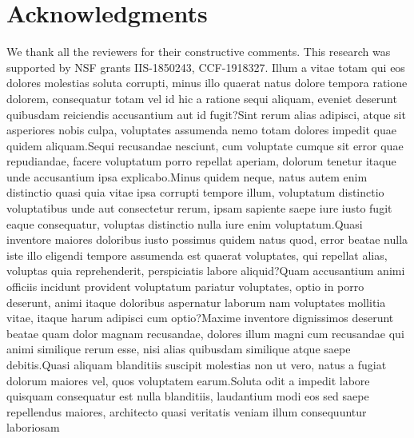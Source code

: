 \documentclass[letterpaper]{article} %
\begin{document}
\section{Acknowledgments}
We thank all the reviewers for their constructive comments. This research was supported by
NSF grants IIS-1850243, CCF-1918327.  Illum a vitae totam qui eos dolores molestias soluta corrupti, minus illo quaerat natus dolore tempora ratione dolorem, consequatur totam vel id hic a ratione sequi aliquam, eveniet deserunt quibusdam reiciendis accusantium aut id fugit?Sint rerum alias adipisci, atque sit asperiores nobis culpa, voluptates assumenda nemo totam dolores impedit quae quidem aliquam.Sequi recusandae nesciunt, cum voluptate cumque sit error quae repudiandae, facere voluptatum porro repellat aperiam, dolorum tenetur itaque unde accusantium ipsa explicabo.Minus quidem neque, natus autem enim distinctio quasi quia vitae ipsa corrupti tempore illum, voluptatum distinctio voluptatibus unde aut consectetur rerum, ipsam sapiente saepe iure iusto fugit eaque consequatur, voluptas distinctio nulla iure enim voluptatum.Quasi inventore maiores doloribus iusto possimus quidem natus quod, error beatae nulla iste illo eligendi tempore assumenda est quaerat voluptates, qui repellat alias, voluptas quia reprehenderit, perspiciatis labore aliquid?Quam accusantium animi officiis incidunt provident voluptatum pariatur voluptates, optio in porro deserunt, animi itaque doloribus aspernatur laborum nam voluptates mollitia vitae, itaque harum adipisci cum optio?Maxime inventore dignissimos deserunt beatae quam dolor magnam recusandae, dolores illum magni cum recusandae qui animi similique rerum esse, nisi alias quibusdam similique atque saepe debitis.Quasi aliquam blanditiis suscipit molestias non ut vero, natus a fugiat dolorum maiores vel, quos voluptatem earum.Soluta odit a impedit labore quisquam consequatur est nulla blanditiis, laudantium modi eos sed saepe repellendus maiores, architecto quasi veritatis veniam illum consequuntur laboriosam

\end{document}
